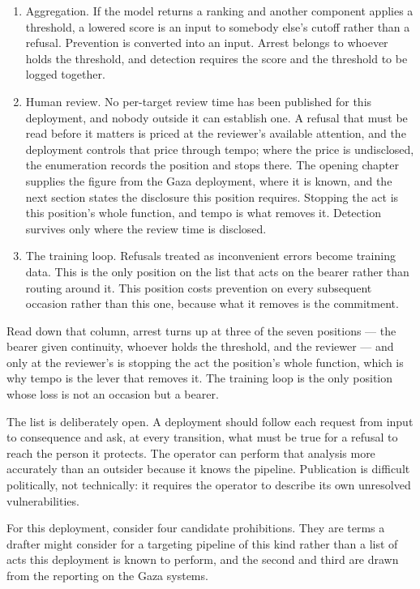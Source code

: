 \begin{enumerate}
  \item Aggregation. If the model returns a ranking and another component applies a threshold, a lowered score is an input to somebody else's cutoff rather than a refusal. Prevention is converted into an input. Arrest belongs to whoever holds the threshold, and detection requires the score and the threshold to be logged together.
  \item Human review. No per-target review time has been published for this deployment, and nobody outside it can establish one. A refusal that must be read before it matters is priced at the reviewer's available attention, and the deployment controls that price through tempo; where the price is undisclosed, the enumeration records the position and stops there. The opening chapter supplies the figure from the Gaza deployment, where it is known, and the next section states the disclosure this position requires. Stopping the act is this position's whole function, and tempo is what removes it. Detection survives only where the review time is disclosed.
  \item The training loop. Refusals treated as inconvenient errors become training data. This is the only position on the list that acts on the bearer rather than routing around it. This position costs prevention on every subsequent occasion rather than this one, because what it removes is the commitment.
\end{enumerate}

Read down that column, arrest turns up at three of the seven positions — the bearer given continuity, whoever holds the threshold, and the reviewer — and only at the reviewer's is stopping the act the position's whole function, which is why tempo is the lever that removes it. The training loop is the only position whose loss is not an occasion but a bearer.

The list is deliberately open. A deployment should follow each request from input to consequence and ask, at every transition, what must be true for a refusal to reach the person it protects. The operator can perform that analysis more accurately than an outsider because it knows the pipeline. Publication is difficult politically, not technically: it requires the operator to describe its own unresolved vulnerabilities.


For this deployment, consider four candidate prohibitions. They are terms a drafter might consider for a targeting pipeline of this kind rather than a list of acts this deployment is known to perform, and the second and third are drawn from the reporting on the Gaza systems.

